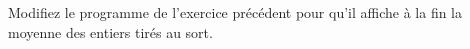 \begin{exo}{}
	Modifiez le programme de l'exercice précédent pour qu'il affiche à la fin la moyenne des entiers tirés au sort.
\end{exo}
